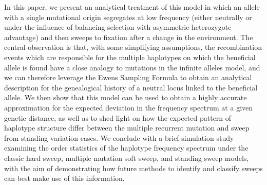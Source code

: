\documentclass[a4paper,10pt]{article}
\begin{document}
In this paper, we present an analytical treatment of this model in which an allele with a single mutational origin segregates at low frequency (either neutrally or under the influence of balancing selection with asymmetric heterozygote advantage) and then sweeps to fixation after a change in the environment. The central observation is that, with some simplifying assumptions, the recombination events which are responsible for the multiple haplotypes on which the beneficial allele is found have a close analogy to mutations in the infinite alleles model, and we can therefore leverage the Ewens Sampling Formula to obtain an analytical description for the genealogical history of a neutral locus linked to the beneficial allele. We then show that this model can be used to obtain a highly accurate approximation for the expected deviation in the frequency spectrum at a given genetic distance, as well as to shed light on how the expected pattern of haplotype structure differ between the multiple recurrent mutation and sweep from standing  variation cases. We conclude with a brief simulation study examining the order statistics of the haplotype frequency spectrum under the classic hard sweep, multiple mutation soft sweep, and standing sweep models, with the aim of demonstrating how future methods to identify and classify sweeps can best make use of this information.
 
\end{document}
